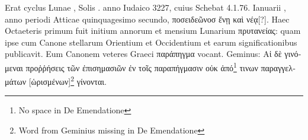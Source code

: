 Erat cyclus Lunae ,
 Solis . anno Iudaico 3227, cuius
Schebat 4.1.76. Ianuarii , anno periodi Atticae quinquagesimo
secundo, \textgreek{ποσειδεῶνοσ ἔνῃ καὶ νέᾳ[?]}.
Haec Octaeteris primum fuit initium annorum
et mensium Lunarium \textgreek{πρυτανείας}: quam ipse cum Canone stellarum
Orientium et Occidentium et earum significationibus publicavit.
Eum Canonem veteres Graeci
\textgreek{παράπηγμα} vocant.
Geminus: \textgreek{Αἱ δὲ
γινόμεναι προῤῥήσεις τῶν ἐπισημασιῶν ἐν τοῖς
παραπήγμασιν οὐκ ἀπό\footnote{No space in De Emendatione} τινων παραγγελμάτων
[ὡρισμένων]\footnote{Word from Geminius missing in De Emendatione} γίνονται}.
